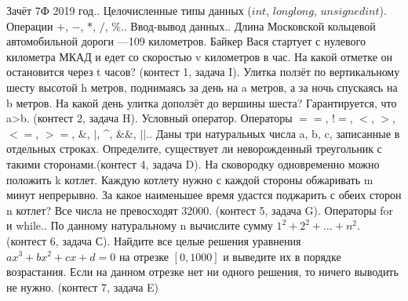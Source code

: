 \documentclass[a4paper,12pt]{article}
\begin{document}
Зачёт 7Ф 2019 год.. Целочисленные типы данных ($int$, $long long$, $unsigned int$). Операции $+$, $-$, $*$, $/$, $\%$.. Ввод-вывод данных.. Длина Московской кольцевой автомобильной дороги —109 километров. Байкер Вася стартует с нулевого километра МКАД и едет со скоростью v километров в час. На какой отметке он остановится через t часов? (контест 1, задача I). Улитка ползёт по вертикальному шесту высотой h метров, поднимаясь за день на a метров, а за ночь спускаясь на b метров. На какой день улитка доползёт до вершины шеста? Гарантируется, что a>b. (контест 2, задача H). Условный оператор. Операторы $==$, $!=$, $<$, $>$, $<=$, $>=$, $\&$, $|$, \textasciicircum, $\&\&$, $||$.. Даны три натуральных числа a, b, c, записанные в отдельных строках. Определите, существует ли неворожденный треугольник с такими сторонами.(контест 4, задача D). На сковородку одновременно можно положить k котлет. Каждую котлету нужно с каждой стороны обжаривать m минут непрерывно. За какое наименьшее время удастся поджарить с обеих сторон n котлет? Все числа не превосходят 32000. (контест 5, задача G). Операторы for и while.. По данному натуральному n вычислите сумму $1^2+2^2+\dots+n^2$. (контест 6, задача С). Найдите все целые решения уравнения $ax^3 + bx^2 + cx + d = 0$ на отрезке $[0,1000]$ и выведите их в порядке возрастания.  Если на данном отрезке нет ни одного решения, то ничего выводить не нужно. (контест 7, задача E)\newline
\end{document}
